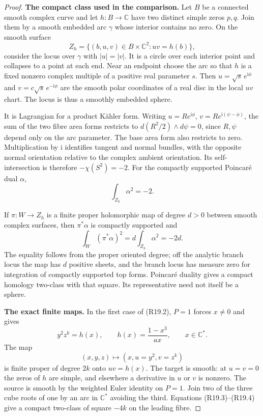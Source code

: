 \begin{proof}
\par\medskip\noindent\textbf{The compact class used in the comparison.}
Let $B$ be a connected smooth complex curve and let
$h:B\to\mathbb C$ have two distinct simple zeros $p,q$.
Join them by a smooth embedded arc $\gamma$ whose
interior contains no zero. On the smooth surface
\[
             Z_h=\{(b,u,v)\in B\times\mathbb C^2:
                                      uv=h(b)\},
\]
consider the locus over $\gamma$ with $|u|=|v|$.
It is a circle over each interior point and collapses
to a point at each end. Near an endpoint choose the
arc so that $h$ is a fixed nonzero complex multiple
of a positive real parameter $s$. Then
$u=\sqrt{s}\,e^{\mathrm i\phi}$ and
$v=c\sqrt{s}\,e^{-\mathrm i\phi}$ are the smooth
polar coordinates of a real disc in the local $uv$
chart. The locus is thus a smoothly embedded sphere.

It is Lagrangian for a product K\"ahler form.
Writing $u=R e^{\mathrm i\phi}$,
$v=R e^{\mathrm i(\psi-\phi)}$, the sum of the two
fibre area forms restricts to
$d(R^2/2)\wedge d\psi=0$, since $R,\psi$ depend
only on the arc parameter. The base area form also
restricts to zero. Multiplication by $\mathrm i$
identifies tangent and normal bundles, with the
opposite normal orientation relative to the complex
ambient orientation. Its self-intersection is
therefore $-\chi(S^2)=-2$.
For the compactly supported Poincar\'e dual $\alpha$,
\[
                         \int_{Z_h}\alpha^2=-2.             \tag{R19.3}
\]

If $\pi:W\to Z_h$ is a finite proper holomorphic map
of degree $d>0$ between smooth complex surfaces, then
$\pi^*\alpha$ is compactly supported and
\[
              \int_W(\pi^*\alpha)^2
                       =d\int_{Z_h}\alpha^2=-2d.            \tag{R19.4}
\]
The equality follows from the proper oriented degree;
off the analytic branch locus the map has $d$ positive
sheets, and the branch locus has measure zero for
integration of compactly supported top forms.
Poincar\'e duality gives a compact homology two-class
with that square. Its representative need not itself
be a sphere.

\par\medskip\noindent\textbf{The exact finite maps.}
In the first case of (R19.2), $P=1$ forces $x\ne0$
and gives
\[
           y^2z^k=h(x),\qquad
           h(x)=\frac{1-x^3}{ax},\qquad x\in\mathbb C^*.
\]
The map
\[
 (x,y,z)\longmapsto(x,u=y^2,v=z^k)
\]
is finite proper of degree $2k$ onto $uv=h(x)$.
The target is smooth: at $u=v=0$ the zeros of $h$
are simple, and elsewhere a derivative in $u$ or
$v$ is nonzero. The source is smooth by the weighted
Euler identity on $P=1$. Join two of the three cube
roots of one by an arc in $\mathbb C^*$ avoiding the
third. Equations (R19.3)--(R19.4) give a compact
two-class of square $-4k$ on the leading fibre.


\end{proof}
